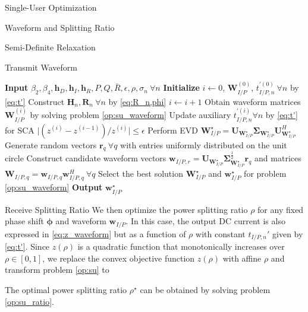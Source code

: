 \documentclass{IEEEtran}
\begin{document}
\begin{section}{Single-User Optimization}
\begin{subsection}{Waveform and Splitting Ratio}
\begin{subsubsection}{Semi-Definite Relaxation}
\begin{paragraph}{Transmit Waveform}
				\begin{algorithm}
					\caption{SDR: Transmit Waveform}
					\label{al:waveform_sdr}
					\begin{algorithmic}[1]
						\State \textbf{Input} $\beta_2,\beta_4,\boldsymbol{h}_D,\boldsymbol{h}_I,\boldsymbol{h}_R,P,Q,\bar{R},\epsilon,\rho,\sigma_n \ \forall n$
						\State \textbf{Initialize} $i \gets 0$, $\boldsymbol{W}_{I/P}^{(0)}$, $t_{I/P,n}^{\prime (0)} \ \forall n$ by \ref{eq:t'}
						\State Construct $\boldsymbol{H}_n,\boldsymbol{R}_n \ \forall n$ by \ref{eq:R_n,phi}
						\Repeat
						\State $i \gets i + 1$
						\State Obtain waveform matrices $\boldsymbol{W}_{I/P}^{(i)}$ by solving problem \ref{op:su_waveform}
						\State Update auxiliary $t_{I/P,n}^{\prime (i)} \forall n$ by \ref{eq:t'} for SCA
						\Until $\lvert (z^{(i)}-z^{(i-1)}) / z^{(i)} \rvert \le \epsilon$
						\State Perform EVD $\boldsymbol{W}_{I/P}^{\star}=\boldsymbol{U}_{\boldsymbol{W}_{I/P}^{\star}}\boldsymbol{\Sigma}_{\boldsymbol{W}_{I/P}^{\star}}\boldsymbol{U}_{\boldsymbol{W}_{I/P}^{\star}}^H$
						\State Generate random vectors $\boldsymbol{r}_q \ \forall q$ with entries uniformly distributed on the unit circle
						\State Construct candidate waveform vectors $\boldsymbol{w}_{I/P,r}=\boldsymbol{U}_{\boldsymbol{W}_{I/P}^{\star}}\boldsymbol{\Sigma}_{\boldsymbol{W}_{I/P}^{\star}}^{\frac{1}{2}}\boldsymbol{r}_q$ and matrices $\boldsymbol{W}_{I/P,q}=\boldsymbol{w}_{I/P,q}\boldsymbol{w}_{I/P,q}^H  \ \forall q$
						\State Select the best solution $\boldsymbol{W}_{I/P}^\star$ and $\boldsymbol{w}_{I/P}^\star$ for problem \ref{op:su_waveform}
						\State \textbf{Output} $\boldsymbol{w}_{I/P}^\star$
					\end{algorithmic}
				\end{algorithm}
			\end{paragraph}

			\begin{paragraph}{Receive Splitting Ratio}
				We then optimize the power splitting ratio $\rho$ for any fixed phase shift $\boldsymbol{\phi}$ and waveform $\boldsymbol{w}_{I/P}$. In this case, the output DC current is also expressed in \ref{eq:z_waveform} but as a function of $\rho$ with constant $t_{I/P,n}'$ given by \ref{eq:t'}. Since $z(\rho)$ is a quadratic function that monotonically increases over $\rho \in [0, 1]$, we replace the convex objective function $z(\rho)$ with affine $\rho$ and transform problem \ref{op:su} to
				\begin{maxi!}
					{\rho}{\rho}{\label{op:su_ratio}}{\label{eq:su_ratio_target}}
				\end{maxi!}
				The optimal power splitting ratio $\rho^\star$ can be obtained by solving problem \ref{op:su_ratio}.
			\end{paragraph}


\end{subsubsection}
\end{subsection}
\end{section}
\end{document}
